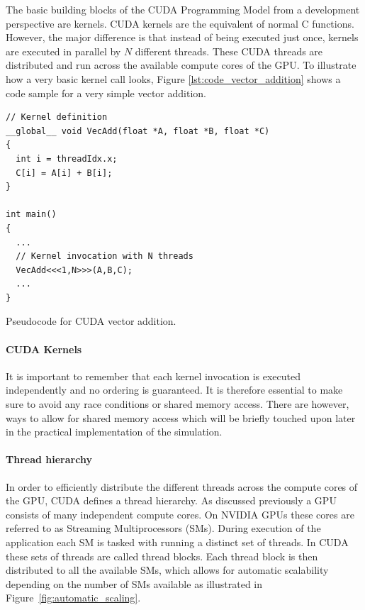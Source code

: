 \documentclass[a4paper,11pt]{kth-mag}
\begin{document}
The basic building blocks of the CUDA Programming Model from a development perspective are kernels. CUDA kernels are the equivalent of normal C functions. However, the major difference is that instead of being executed just once, kernels are executed in parallel by $N$ different threads. These CUDA threads are distributed and run across the available compute cores of the GPU. To illustrate how a very basic kernel call looks, Figure \ref{lst:code_vector_addition} shows a code sample for a very simple vector addition.

\begin{listing}[!htbp]
  \centering
  \begin{verbatim}
// Kernel definition
__global__ void VecAdd(float *A, float *B, float *C)
{
  int i = threadIdx.x;
  C[i] = A[i] + B[i];
}

int main()
{
  ...
  // Kernel invocation with N threads
  VecAdd<<<1,N>>>(A,B,C);
  ...
}
  \end{verbatim}
  \caption{Pseudocode for CUDA vector addition.}
  \label{lst:code_vector_addition}
\end{listing}

\paragraph{CUDA Kernels}

It is important to remember that each kernel invocation is executed independently and no ordering is guaranteed. It is therefore essential to make sure to avoid any race conditions or shared memory access. There are however, ways to allow for shared memory access which will be briefly touched upon later in the practical implementation of the simulation.

\paragraph{Thread hierarchy}

In order to efficiently distribute the different threads across the compute cores of the GPU, CUDA defines a thread hierarchy. As discussed previously a GPU consists of many independent compute cores. On NVIDIA GPUs these cores are referred to as Streaming Multiprocessors (SMs). During execution of the application each SM is tasked with running a distinct set of threads. In CUDA these sets of threads are called thread blocks. Each thread block is then distributed to all the available SMs, which allows for automatic scalability depending on the number of SMs available  as illustrated in Figure~\ref{fig:automatic_scaling}.
\end{document}
